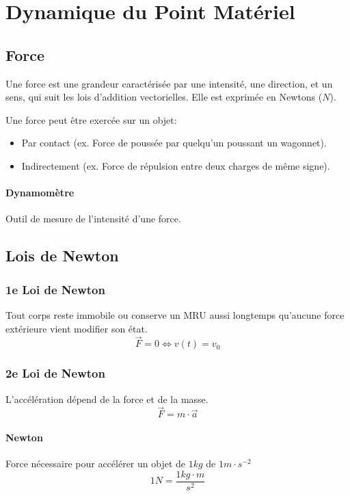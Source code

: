 \renewcommand\thesection{II}
\section{Dynamique du Point Matériel}

\begin{multicols*}{2}
    \subsection{Force}
    Une force est une grandeur caractérisée par une intensité, une direction, et un sens, qui suit les lois d'addition vectorielles. Elle est exprimée en Newtons ($N$).
    
    Une force peut être exercée sur un objet:
    \begin{itemize}
        \item Par contact (ex. Force de poussée par quelqu'un poussant un wagonnet).
        \item Indirectement (ex. Force de répulsion entre deux charges de même signe).
    \end{itemize}
    
    \paragraph{Dynamomètre}
    Outil de mesure de l'intensité d'une force.
    
    \subsection{Lois de Newton}
    \subsubsection{1e Loi de Newton}
    Tout corps reste immobile ou conserve un MRU aussi longtemps qu'aucune force extérieure vient modifier son état.
    \[ \vec F = 0 \Leftrightarrow v(t) = v_0 \]
    
    \subsubsection{2e Loi de Newton}
    L'accélération dépend de la force et de la masse.
    \[ \vec F = m \cdot \vec a \]
    
    \paragraph{Newton} 
    Force nécessaire pour accélérer un objet de $1kg$ de $1m\cdot s^{-2}$
    \[ 1N = \frac{1 kg \cdot m}{s^2}\]
    

\end{multicols*}
